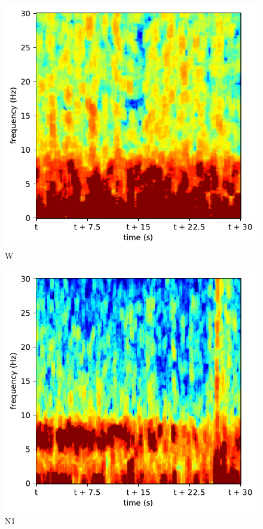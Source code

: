 \begin{subfigure}{.16\textwidth}
  \centering
  \includegraphics[width=1\linewidth]{./../Article/pics/class_clean_0}
  \caption{W}
  \label{fig_1_11}
\end{subfigure}%
\begin{subfigure}{.16\textwidth}
  \centering
  \includegraphics[width=1\linewidth]{./../Article/pics/class_clean_1}
  \caption{N1}
  \label{fig_1_12}
\end{subfigure}%
